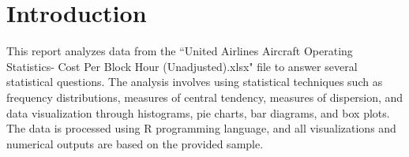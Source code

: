 \section*{Introduction}
This report analyzes data from the ``United Airlines Aircraft Operating Statistics- Cost Per Block Hour (Unadjusted).xlsx" file
to answer several statistical questions. The analysis involves using statistical techniques
such as frequency distributions, measures of central tendency, measures of dispersion, and data visualization
through histograms, pie charts, bar diagrams, and box plots.
The data is processed using R programming language, and all visualizations and numerical outputs are based on the provided sample.